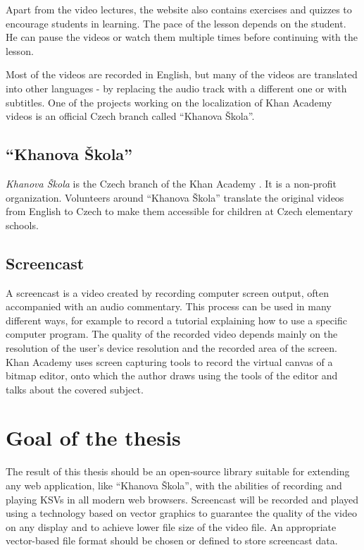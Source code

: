 Apart from the video lectures, the website also contains exercises and quizzes to encourage students in learning. The pace of the lesson depends on the student. He can pause the videos or watch them multiple times before continuing with the lesson.

Most of the videos are recorded in English, but many of the videos are translated into other languages - by replacing the audio track with a different one or with subtitles. One of the projects working on the localization of Khan Academy videos is an official Czech branch called ``Khanova Škola''.

\subsection*{``Khanova Škola''}
\textit{Khanova Škola} is the Czech branch of the Khan Academy \cite{khanova_skola}. It is a non-profit organization. Volunteers around ``Khanova Škola'' translate the original videos from English to Czech to make them accessible for children at Czech elementary schools.

\subsection*{Screencast}
A screencast is a video created by recording computer screen output, often accompanied with an audio commentary. This process can be used in many different ways, for example to record a tutorial explaining how to use a specific computer program. The quality of the recorded video depends mainly on the resolution of the user's device resolution and the recorded area of the screen. Khan Academy uses screen capturing tools to record the virtual canvas of a bitmap editor, onto which the author draws using the tools of the editor and talks about the covered subject.

\section*{Goal of the thesis}

The result of this thesis should be an open-source library suitable for extending any web application, like ``Khanova Škola'', with the abilities of recording and playing KSVs in all modern web browsers. Screencast will be recorded and played using a technology based on vector graphics to guarantee the quality of the video on any display and to achieve lower file size of the video file. An appropriate vector-based file format should be chosen or defined to store screencast data.


